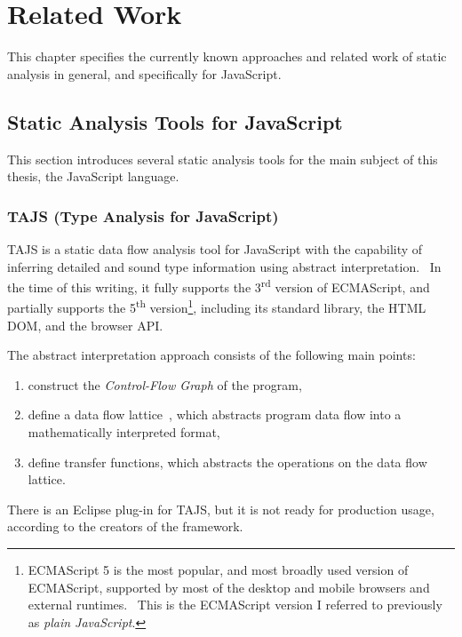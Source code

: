 \chapter{Related Work}

This chapter specifies the currently known approaches and related work of static analysis in general, and specifically for JavaScript.


\section{Static Analysis Tools for JavaScript}

This section introduces several static analysis tools for the main subject of this thesis, the JavaScript language.


\subsection{TAJS (Type Analysis for JavaScript)}

TAJS is a static data flow analysis tool for JavaScript with the capability of inferring detailed and sound type information using abstract interpretation.~\cite{jensen2009type} In the time of this writing, it fully supports the 3\textsuperscript{rd} version of ECMAScript, and partially supports the 5\textsuperscript{th} version\footnote{ECMAScript 5 is the most popular, and most broadly used version of ECMAScript, supported by most of the desktop and mobile browsers and external runtimes.~\cite{kangax-es5} This is the ECMAScript version I referred to previously as \emph{plain JavaScript}.}, including its standard library, the HTML DOM, and the browser API.~\cite{tajs-github}

The abstract interpretation approach consists of the following main points:~\cite{tajs-presentation}

\begin{enumerate}
\item construct the \emph{Control-Flow Graph} of the program,
\item define a data flow lattice~\cite{jensen2009type}, which abstracts program data flow into a mathematically interpreted format,
\item define transfer functions, which abstracts the operations on the data flow lattice.
\end{enumerate}

There is an Eclipse plug-in for TAJS, but it is not ready for production usage, according to the creators of the framework.~\cite{tajs-website}


